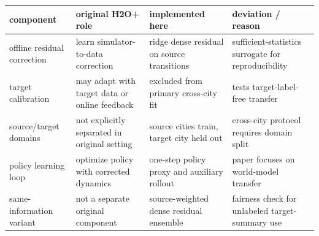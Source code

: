 \begin{tabular}{llll}
\toprule
component & original H2O+ role & implemented here & deviation / reason \\
\midrule
offline residual correction & learn simulator-to-data correction & ridge dense residual on source transitions & sufficient-statistics surrogate for reproducibility \\
target calibration & may adapt with target data or online feedback & excluded from primary cross-city fit & tests target-label-free transfer \\
source/target domains & not explicitly separated in original setting & source cities train, target city held out & cross-city protocol requires domain split \\
policy learning loop & optimize policy with corrected dynamics & one-step policy proxy and auxiliary rollout & paper focuses on world-model transfer \\
same-information variant & not a separate original component & source-weighted dense residual ensemble & fairness check for unlabeled target-summary use \\
\bottomrule
\end{tabular}
